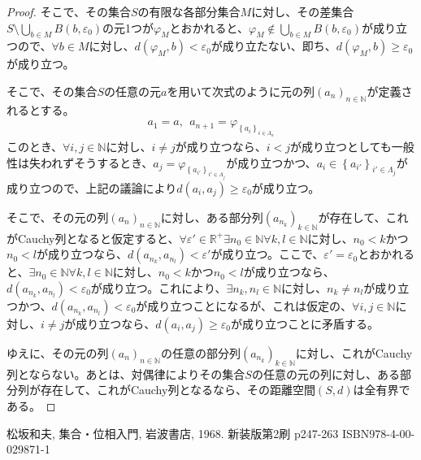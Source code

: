 \documentclass[dvipdfmx]{jsarticle}
\begin{document}
\begin{proof}
そこで、その集合$S$の有限な各部分集合$M$に対し、その差集合$S \setminus \bigcup_{b \in M} {B\left( b,\varepsilon_{0} \right)}$の元1つが$\varphi_{M}$とおかれると、$\varphi_{M} \notin \bigcup_{b \in M} {B\left( b,\varepsilon_{0} \right)}$が成り立つので、$\forall b \in M$に対し、$d\left( \varphi_{M},b \right) < \varepsilon_{0}$が成り立たない、即ち、$d\left( \varphi_{M},b \right) \geq \varepsilon_{0}$が成り立つ。\par
そこで、その集合$S$の任意の元$a$を用いて次式のように元の列$\left( a_{n} \right)_{n \in \mathbb{N}}$が定義されるとする。
\begin{align*}
a_{1} = a,\ \ a_{n + 1} = \varphi_{\left\{ a_{i} \right\}_{i \in \varLambda_{n}}}
\end{align*}
このとき、$\forall i,j \in \mathbb{N}$に対し、$i \neq j$が成り立つなら、$i < j$が成り立つとしても一般性は失われずそうするとき、$a_{j} = \varphi_{\left\{ a_{i'} \right\}_{i' \in \varLambda_{j}}}$が成り立つかつ、$a_{i} \in \left\{ a_{i'} \right\}_{i' \in \varLambda_{j}}$が成り立つので、上記の議論により$d\left( a_{i},a_{j} \right) \geq \varepsilon_{0}$が成り立つ。\par
そこで、その元の列$\left( a_{n} \right)_{n \in \mathbb{N}}$に対し、ある部分列$\left( a_{n_{k}} \right)_{k \in \mathbb{N}}$が存在して、これがCauchy列となると仮定すると、$\forall\varepsilon' \in \mathbb{R}^{+}\exists n_{0} \in \mathbb{N}\forall k,l \in \mathbb{N}$に対し、$n_{0} < k$かつ$n_{0} < l$が成り立つなら、$d\left( a_{n_{k}},a_{n_{l}} \right) < \varepsilon'$が成り立つ。ここで、$\varepsilon' = \varepsilon_{0}$とおかれると、$\exists n_{0} \in \mathbb{N}\forall k,l \in \mathbb{N}$に対し、$n_{0} < k$かつ$n_{0} < l$が成り立つなら、$d\left( a_{n_{k}},a_{n_{l}} \right) < \varepsilon_{0}$が成り立つ。これにより、$\exists n_{k},n_{l} \in \mathbb{N}$に対し、$n_{k} \neq n_{l}$が成り立つかつ、$d\left( a_{n_{k}},a_{n_{l}} \right) < \varepsilon_{0}$が成り立つことになるが、これは仮定の、$\forall i,j \in \mathbb{N}$に対し、$i \neq j$が成り立つなら、$d\left( a_{i},a_{j} \right) \geq \varepsilon_{0}$が成り立つことに矛盾する。\par
ゆえに、その元の列$\left( a_{n} \right)_{n \in \mathbb{N}}$の任意の部分列$\left( a_{n_{k}} \right)_{k \in \mathbb{N}}$に対し、これがCauchy列とならない。あとは、対偶律によりその集合$S$の任意の元の列に対し、ある部分列が存在して、これがCauchy列となるなら、その距離空間$(S,d)$は全有界である。
\end{proof}
\begin{thebibliography}{50}
  松坂和夫, 集合・位相入門, 岩波書店, 1968. 新装版第2刷 p247-263 ISBN978-4-00-029871-1
\end{thebibliography}
\end{document}
